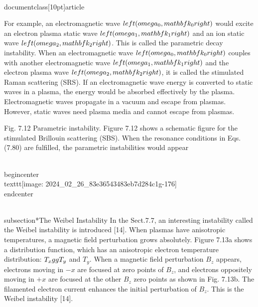 \\documentclass[10pt]{article}
\begin{document}
{{{{For example, an electromagnetic wave $\\left(\\omega_{0}, \\mathbf{k}_{0}\\right)$ would excite an electron plasma static wave $\\left(\\omega_{1}, \\mathbf{k}_{1}\\right)$ and an ion static wave $\\left(\\omega_{2}, \\mathbf{k}_{2}\\right)$. This is called the parametric decay instability. When an electromagnetic wave $\\left(\\omega_{0}, \\mathbf{k}_{0}\\right)$ couples with another electromagnetic wave $\\left(\\omega_{1}, \\mathbf{k}_{1}\\right)$ and the electron plasma wave $\\left(\\omega_{2}, \\mathbf{k}_{2}\\right)$, it is called the stimulated Raman scattering (SRS). If an electromagnetic wave energy is converted to static waves in a plasma, the energy would be absorbed effectively by the plasma. Electromagnetic waves propagate in a vacuum and escape from plasmas. However, static waves need plasma media and cannot escape from plasmas.

Fig. 7.12 Parametric instability. Figure 7.12 shows a schematic figure for the stimulated Brillouin scattering (SBS). When the resonance conditions in Eqs. (7.80) are fulfilled, the parametric instabilities would appear

\\begin{center}
\\texttt{[image: 2024\_02\_26\_83e36543483eb7d284c1g-176]}
\\end{center}

\\subsection*{The Weibel Instability}
In the Sect.7.7, an interesting instability called the Weibel instability is introduced [14]. When plasmas have anisotropic temperatures, a magnetic field perturbation grows absolutely. Figure 7.13a shows a distribution function, which has an anisotropic electron temperature distribution: $T_{x} \\gg T_{y}$ and $T_{y}$. When a magnetic field perturbation $B_{z}$ appears, electrons moving in $-x$ are focused at zero points of $B_{z}$, and electrons oppositely moving in $+x$ are focused at the other $B_{z}$ zero points as shown in Fig. 7.13b. The filamented electron current enhances the initial perturbation of $B_{z}$. This is the Weibel instability [14].

}}}}
\end{document}
